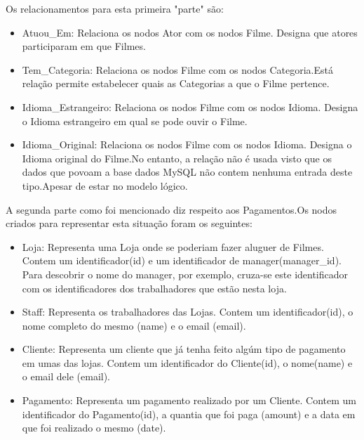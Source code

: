 Os relacionamentos para esta primeira "parte" são:

\begin{itemize}

\item Atuou\_Em: Relaciona os nodos Ator com os nodos Filme. Designa que atores participaram em que Filmes.
\hfill\\
\item Tem\_Categoria: Relaciona os nodos Filme com os nodos Categoria.Está relação permite estabelecer quais as Categorias a que o Filme pertence.
\hfill\\
\item Idioma\_Estrangeiro: Relaciona os nodos Filme com os nodos Idioma. Designa o Idioma estrangeiro em qual se pode ouvir o Filme.
\hfill\\
\item Idioma\_Original: Relaciona os nodos Filme com os nodos Idioma. Designa o Idioma original do Filme.No entanto, a relação não é usada visto que os dados que povoam a base dados MySQL não contem nenhuma entrada deste tipo.Apesar de estar no modelo lógico.
\end{itemize}

A segunda parte como foi mencionado diz respeito aos Pagamentos.Os nodos criados para representar esta situação foram os seguintes:

\begin{itemize}

\item Loja: Representa uma Loja onde se poderiam fazer aluguer de Filmes. Contem um identificador(id) e um identificador de manager(manager\_id). Para descobrir o nome do manager, por exemplo, cruza-se este identificador com os identificadores dos trabalhadores que estão nesta loja.
\hfill\\
\item Staff: Representa os trabalhadores das Lojas. Contem um identificador(id), o nome completo do mesmo (name) e o email (email).
\hfill\\
\item Cliente: Representa um cliente que já tenha feito algúm tipo de pagamento em umas das lojas. Contem um identificador do Cliente(id), o nome(name) e o email dele (email).
\hfill\\
\item Pagamento: Representa um pagamento realizado por um Cliente. Contem um identificador do Pagamento(id), a quantia que foi paga (amount) e a data em que foi realizado o mesmo (date).

\end{itemize}

